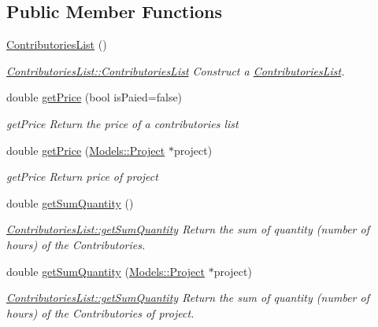 \subsection*{Public Member Functions}
\begin{DoxyCompactItemize}
\item 
\hypertarget{classModels_1_1ContributoriesList_a3563e04b5d5b144846679f3ef4fd9387}{\hyperlink{classModels_1_1ContributoriesList_a3563e04b5d5b144846679f3ef4fd9387}{Contributories\-List} ()}\label{classModels_1_1ContributoriesList_a3563e04b5d5b144846679f3ef4fd9387}

\begin{DoxyCompactList}\small\item\em \hyperlink{classModels_1_1ContributoriesList_a3563e04b5d5b144846679f3ef4fd9387}{Contributories\-List\-::\-Contributories\-List} Construct a \hyperlink{classModels_1_1ContributoriesList}{Contributories\-List}. \end{DoxyCompactList}\item 
double \hyperlink{classModels_1_1ContributoriesList_a29712a353353a14f06a44314fffbe61c}{get\-Price} (bool is\-Paied=false)
\begin{DoxyCompactList}\small\item\em get\-Price Return the price of a contributories list \end{DoxyCompactList}\item 
double \hyperlink{classModels_1_1ContributoriesList_ad5ffb2920d2c818f1283a3f26b14a058}{get\-Price} (\hyperlink{classModels_1_1Project}{Models\-::\-Project} $\ast$project)
\begin{DoxyCompactList}\small\item\em get\-Price Return price of project \end{DoxyCompactList}\item 
double \hyperlink{classModels_1_1ContributoriesList_af9b3b1b703cebeef552d058999ffcc4c}{get\-Sum\-Quantity} ()
\begin{DoxyCompactList}\small\item\em \hyperlink{classModels_1_1ContributoriesList_af9b3b1b703cebeef552d058999ffcc4c}{Contributories\-List\-::get\-Sum\-Quantity} Return the sum of quantity (number of hours) of the Contributories. \end{DoxyCompactList}\item 
double \hyperlink{classModels_1_1ContributoriesList_a7b3cbc06dace77fcc1d00fd8f25fa87a}{get\-Sum\-Quantity} (\hyperlink{classModels_1_1Project}{Models\-::\-Project} $\ast$project)
\begin{DoxyCompactList}\small\item\em \hyperlink{classModels_1_1ContributoriesList_af9b3b1b703cebeef552d058999ffcc4c}{Contributories\-List\-::get\-Sum\-Quantity} Return the sum of quantity (number of hours) of the Contributories of project. \end{DoxyCompactList}\item 

\end{DoxyCompactItemize}
